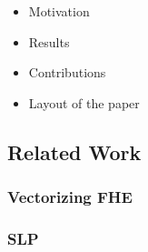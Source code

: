 \begin{itemize}
    \item Motivation
    \item Results
    \item Contributions
    \item Layout of the paper
\end{itemize}
\subsection{Related Work}
\subsubsection{Vectorizing FHE} 
\subsubsection{SLP} 